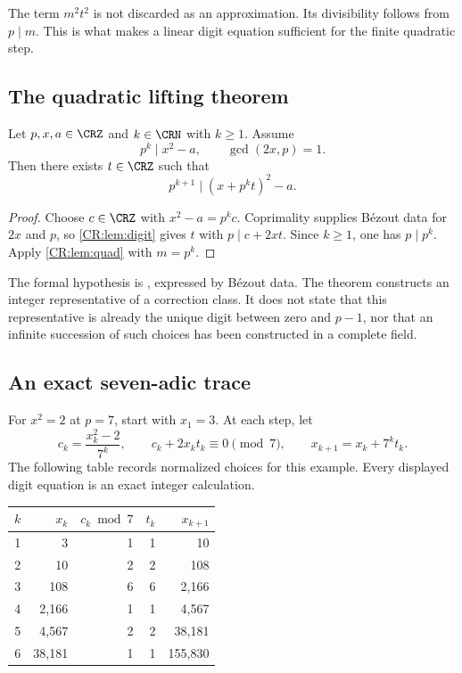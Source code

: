 The term $m^2t^2$ is not discarded as an approximation. Its divisibility follows from $p\mid m$. This is what makes a linear digit equation sufficient for the finite quadratic step.

\subsection{The quadratic lifting theorem}
\begin{CRtheorem}\label{CR:thm:hensel}
Let $p,x,a\in\CRZ$ and $k\in\CRN$ with $k\geq1$. Assume
\[
p^k\mid x^2-a,\qquad \gcd(2x,p)=1.
\]
Then there exists $t\in\CRZ$ such that
\begin{equation}\label{CR:eq:hensel}
p^{k+1}\mid (x+p^kt)^2-a.
\end{equation}
\end{CRtheorem}
\begin{proof}
Choose $c\in\CRZ$ with $x^2-a=p^kc$. Coprimality supplies B\'ezout data for $2x$ and $p$, so \cref{CR:lem:digit} gives $t$ with $p\mid c+2xt$. Since $k\geq1$, one has $p\mid p^k$. Apply \cref{CR:lem:quad} with $m=p^k$.
\end{proof}

The formal hypothesis is , expressed by B\'ezout data. The theorem constructs an integer representative of a correction class. It does not state that this representative is already the unique digit between zero and $p-1$, nor that an infinite succession of such choices has been constructed in a complete field.

\subsection{An exact seven-adic trace}\label{CR:sec:trace}
For $x^2=2$ at $p=7$, start with $x_1=3$. At each step, let
\[
c_k=\frac{x_k^2-2}{7^k},\qquad
c_k+2x_kt_k\equiv0\pmod7,\qquad
x_{k+1}=x_k+7^kt_k.
\]
The following table records normalized choices for this example. Every displayed digit equation is an exact integer calculation.

\begin{center}
\begin{tabular}{@{}rrrrr@{}}
\toprule
$k$ & $x_k$ & $c_k\bmod7$ & $t_k$ & $x_{k+1}$\\
\midrule
1 & 3 & 1 & 1 & 10\\
2 & 10 & 2 & 2 & 108\\
3 & 108 & 6 & 6 & 2,166\\
4 & 2,166 & 1 & 1 & 4,567\\
5 & 4,567 & 2 & 2 & 38,181\\
6 & 38,181 & 1 & 1 & 155,830\\
\bottomrule
\end{tabular}
\end{center}

